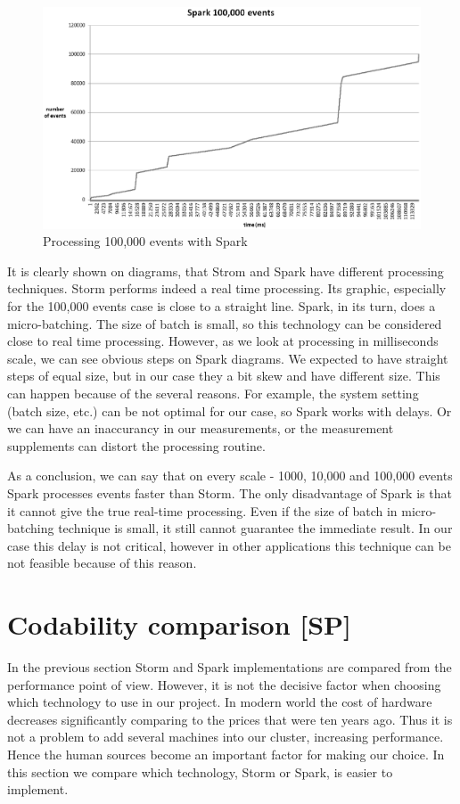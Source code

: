 \begin{figure}
  \centering
  \includegraphics [width=1.1\textwidth]{images/spark100000}
  \caption{Processing 100,000 events with Spark}
  \label{fig:spark100000}
\end{figure}

It is clearly shown on diagrams, that Strom and Spark have different processing techniques.
Storm performs indeed a real time processing.
Its graphic, especially for the 100,000 events case is close to a straight line.
Spark, in its turn, does a micro-batching.
The size of batch is small, so this technology can be considered close to real time processing.
However, as we look at processing in milliseconds scale, we can see obvious steps on Spark diagrams. 
We expected to have straight steps of equal size, but in our case they a bit skew and have different size.
This can happen because of the several reasons.
For example, the system setting (batch size, etc.) can be not optimal for our case, so Spark works with delays.
Or we can have an inaccurancy in our measurements, or the measurement supplements can distort the processing routine.    

As a conclusion, we can say that on every scale - 1000, 10,000 and 100,000 events Spark processes events faster than Storm.
The only disadvantage of Spark is that it cannot give the true real-time processing.
Even if the size of batch in micro-batching technique is small, it still cannot guarantee the immediate result.
In our case this delay is not critical, however in other applications this technique can be not feasible because of this reason.  

\section{Codability comparison [SP]}
In the previous section Storm and Spark implementations are compared from the performance point of view.
However, it is not the decisive factor when choosing which technology to use in our project.
In modern world the cost of hardware decreases significantly comparing to the prices that were ten years ago.
Thus it is not a problem to add several machines into our cluster, increasing performance.
Hence the human sources become an important factor for making our choice.
In this section we compare which technology, Storm or Spark, is easier to implement.

